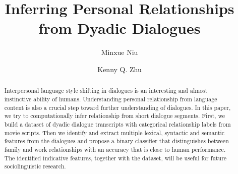 \documentclass{ecai}
\title{Inferring Personal Relationships from Dyadic Dialogues}
\author{Minxue Niu \and Kenny Q. Zhu 
\institute{Shanghai Jiao Tong University, China, 
  email: kzhu@cs.sjtu.edu.cn}}
\begin{document}
\maketitle

\begin{abstract}
Interpersonal language style shifting in dialogues is an interesting and almost 
instinctive ability of humans. Understanding personal relationship from language content is also 
a crucial step toward further understanding of dialogues. 
In this paper, we try to computationally infer relationship from 
short dialogue segments. First, we build 
a dataset of dyadic dialogue transcripts with categorical relationship labels 
from movie scripts. 
Then we identify and extract multiple lexical, syntactic and 
semantic features from the dialogues and propose a binary
classifier that distinguishes between family and work relationships with
an accuracy that is close to human performance. 
The identified indicative features, together with the dataset, 
will be useful for future sociolinguistic research.
\end{abstract}















%
\end{document}
